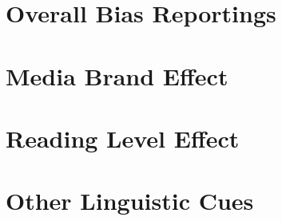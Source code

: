 \section{Overall Bias Reportings}


\section{Media Brand Effect}

\section{Reading Level Effect}

\section{Other Linguistic Cues}


%
 